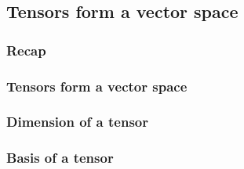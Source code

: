 
\subsection{Tensors form a vector space}

\subsubsection{Recap}

\subsubsection{Tensors form a vector space}

\subsubsection{Dimension of a tensor}

\subsubsection{Basis of a tensor}


